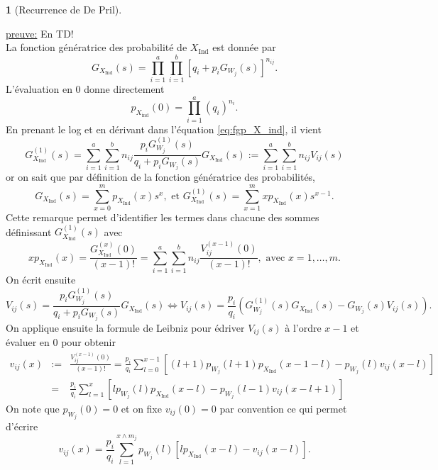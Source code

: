 \documentclass[8pt,notheorems]{beamer}
\newtheorem{theorem}{\translate{Theorem}}[section]
\newtheorem{theorem}{\translate{Theorem}}
\theoremstyle{definition}
\theoremstyle{example}
\theoremstyle{mystyle}
\theoremstyle{plain}
\begin{document}
\begin{frame}[allowframebreaks]
\begin{theorem}[Recurrence de De Pril]
\end{theorem}
\underline{preuve:} En TD!\\
La fonction génératrice des probabilité de $X_{\text{Ind}}$ est donnée par 
\begin{equation}\label{eq:fgp_X_ind}
G_{X_{\text{Ind}}}(s)=\prod_{i = 1}^{a}\prod_{i = 1}^{b}\left[q_i+p_iG_{W_j}(s)\right]^{n_{ij}}.
\end{equation}
L'évaluation en $0$ donne directement 
$$
p_{X_{\text{ind}}}(0) = \prod_{i = 1}^{a}(q_i)^{n_i}. 
$$
En prenant le log et en dérivant dans l'équation \eqref{eq:fgp_X_ind}, il vient 
$$
G^{(1)}_{X_{\text{Ind}}}(s) = \sum_{i = 1}^{a}\sum_{i = 1}^{b}n_{ij}\frac{p_iG^{(1)}_{W_j}(s)}{q_i+p_iG_{W_j}(s)}G_{X_{\text{Ind}}}(s):=\sum_{i = 1}^{a}\sum_{i = 1}^{b}n_{ij}V_{ij}(s)
$$
or on sait que par définition de la fonction génératrice des probabilités, 
$$
G_{X_{\text{Ind}}}(s) = \sum_{x = 0}^mp_{X_{\text{Ind}}}(x)s^x,\text{ et }G^{(1)}_{X_{\text{Ind}}}(s) = \sum_{x = 1}^{m}xp_{X_{\text{Ind}}}(x)s^{x-1}.
$$
Cette remarque permet d'identifier les termes dans chacune des sommes définissant $G^{(1)}_{X_{\text{Ind}}}(s)$ avec 
$$
xp_{X_{\text{Ind}}}(x) = \frac{G^{(x)}_{X_{\text{Ind}}}(0)}{(x-1)!} = \sum_{i = 1}^{a}\sum_{i = 1}^{b}n_{ij}\frac{V^{(x-1)}_{ij}(0)}{(x-1)!},\text{ avec }x=1,\ldots, m.
$$
On écrit ensuite 
$$
V_{ij}(s) = \frac{p_iG^{(1)}_{W_j}(s)}{q_i+p_iG_{W_j}(s)}G_{X_{\text{Ind}}}(s)\Leftrightarrow V_{ij}(s) = \frac{p_i}{q_i}\left(G^{(1)}_{W_j}(s)G_{X_{\text{Ind}}}(s)-G_{W_j}(s)V_{ij}(s)\right).
$$
On applique ensuite la formule de Leibniz pour édriver $V_{ij}(s)$ à l'ordre $x-1$ et évaluer en $0$ pour obtenir
\begin{eqnarray}
v_{ij}(x)&:=&\frac{V^{(x-1)}_{ij}(0)}{(x-1)!}=\frac{p_i}{q_i}\sum_{l = 0}^{x-1}\left[(l+1)p_{W_{j}}(l+1)p_{X_{\text{Ind}}}(x-1-l)-p_{W_{j}}(l)v_{ij}(x-l)\right]\nonumber\\
&=&\frac{p_i}{q_i}\sum_{l = 1}^{x}\left[lp_{W_{j}}(l)p_{X_{\text{Ind}}}(x-l)-p_{W_{j}}(l-1)v_{ij}(x-l+1)\right]
\end{eqnarray}
On note que $p_{W_{j}}(0)=0$ et on fixe $v_{ij}(0) = 0$ par convention ce qui permet d'écrire
$$
v_{ij}(x)=\frac{p_i}{q_i}\sum_{l = 1}^{x\land m_j}p_{W_{j}}(l)\left[lp_{X_{\text{Ind}}}(x-l)-v_{ij}(x-l)\right].
$$
\end{frame}
\end{document}
